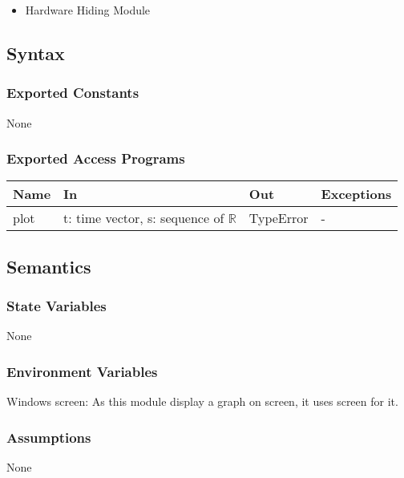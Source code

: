 \documentclass[12pt, titlepage]{article}
\begin{document}
\begin{itemize}
    \item Hardware Hiding Module
\end{itemize}

\subsection{Syntax}

\subsubsection{Exported Constants}

None

\subsubsection{Exported Access Programs}

\begin{center}
\begin{tabular}{p{2cm} p{4cm} p{4cm} p{2cm}}
\hline
\textbf{Name} & \textbf{In} & \textbf{Out} & \textbf{Exceptions} \\
\hline
plot & t: time vector, s: sequence of $\mathbb{R}$ & TypeError & -  \\
\hline
\end{tabular}
\end{center}

\subsection{Semantics}

\subsubsection{State Variables}

None

\subsubsection{Environment Variables}

Windows screen: As this module display a graph on screen, it uses screen for it. 

\subsubsection{Assumptions}

None
\end{document}
